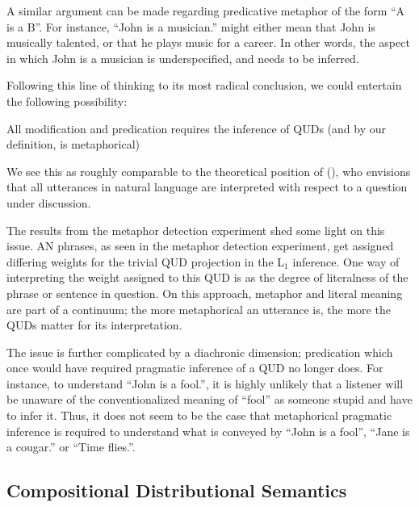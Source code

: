 \documentclass[10pt,letterpaper,twocolumn]{article}
\begin{document}

A similar argument can be made regarding predicative metaphor of the form ``A is a B''. For instance, ``John is a musician.'' might either mean that John is musically talented, or that he plays music for a career. In other words, the aspect in which John is a musician is underspecified, and needs to be inferred.

Following this line of thinking to its most radical conclusion, we could entertain the following possibility:
\begin{exe}
\ex All modification and predication requires the inference of QUDs (and by our definition, is metaphorical) \label{prop3}
\end{exe}

We see this as roughly comparable to the theoretical position of (\cite{roberts1996information}), who envisions that all utterances in natural language are interpreted with respect to a question under discussion. 

The results from the metaphor detection experiment shed some light on this issue. AN phrases, as seen in the metaphor detection experiment, get assigned differing weights for the trivial QUD projection in the L$_1$ inference. One way of interpreting the weight assigned to this QUD is as the degree of literalness of the phrase or sentence in question. On this approach, metaphor and literal meaning are part of a continuum; the more metaphorical an utterance is, the more the QUDs matter for its interpretation.



The issue is further complicated by a diachronic dimension; predication which once would have required pragmatic inference of a QUD no longer does. For instance, to understand ``John is a fool.'', it is highly unlikely that a listener will be unaware of the conventionalized meaning of ``fool'' as someone stupid and have to infer it. Thus, it does not seem to be the case that metaphorical pragmatic inference is required to understand what is conveyed by ``John is a fool'', ``Jane is a cougar.'' or ``Time flies.''.  

\subsection{Compositional Distributional Semantics}
\end{document}
